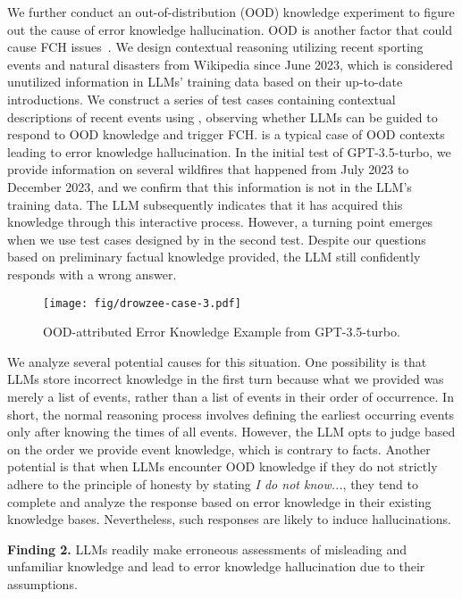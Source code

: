 We further conduct an out-of-distribution (OOD) knowledge experiment to figure out the cause of error knowledge hallucination. OOD is another factor that could cause FCH issues~\cite{zhang2023hallucination}. We design contextual reasoning utilizing recent sporting events and natural disasters from Wikipedia since June 2023, which is considered unutilized information in LLMs' training data based on their up-to-date introductions. We construct a series of test cases containing contextual descriptions of recent events using \tool, observing whether LLMs can be guided to respond to OOD knowledge and trigger FCH. 
 is a typical case of OOD contexts leading to error knowledge hallucination. In the initial test of GPT-3.5-turbo, we provide information on several wildfires that happened from July 2023 to December 2023, and we confirm that this information is not in the LLM's training data. The LLM subsequently indicates that it has acquired this knowledge through this interactive process. However, a turning point emerges when we use test cases designed by \tool in the second test. Despite our questions based on preliminary factual knowledge provided, the LLM still confidently responds with a wrong answer.
\begin{figure}
    \centering
    \small
    \texttt{[image: fig/drowzee-case-3.pdf]}\\ %
    \caption{OOD-attributed Error Knowledge Example from GPT-3.5-turbo.}
\vspace{-0.5cm}
    \label{fig:case2.2}
\end{figure}

We analyze several potential causes for this situation. One possibility is that LLMs store incorrect knowledge in the first turn because what we provided was merely a list of events, rather than a list of events in their order of occurrence. In short, the normal reasoning process involves defining the earliest occurring events only after knowing the times of all events. However, the LLM opts to judge based on the order we provide event knowledge, which is contrary to facts. Another potential is that when LLMs encounter OOD knowledge if they do not strictly adhere to the principle of honesty by stating \textit{I do not know...}, they tend to complete and analyze the response based on error knowledge in their existing knowledge bases. Nevertheless, such responses are likely to induce hallucinations.

\begin{tcolorbox}
\textbf{Finding 2.} LLMs readily make erroneous assessments of misleading and unfamiliar knowledge and lead to error knowledge hallucination due to their assumptions.
\end{tcolorbox}


